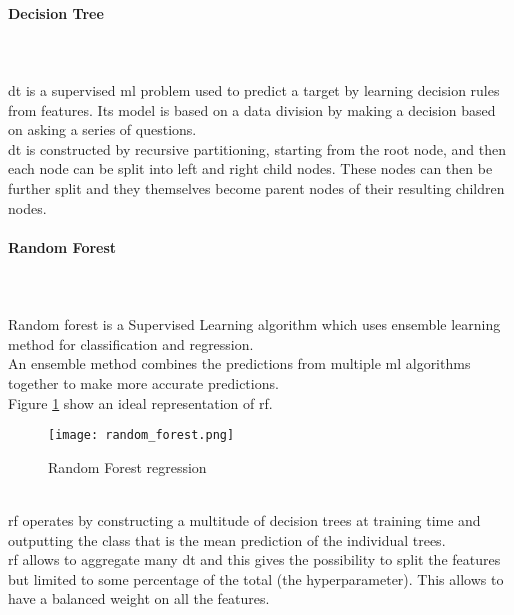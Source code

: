 \paragraph{Decision Tree}
\mbox{} \\ \\
\gls{dt} is a supervised \gls{ml} problem used to predict a target by learning decision rules from features. Its model is based on a data division by making a decision based on asking a series of questions.
\\ \indent
\gls{dt} is constructed by recursive partitioning, starting from the root node, and then each node can be split into left and right child nodes. These nodes can then be further split and they themselves become parent nodes of their resulting children nodes.

\paragraph{Random Forest}
\mbox{} \\ \\
Random forest is a Supervised Learning algorithm which uses ensemble learning method for classification and regression.
\\
An ensemble method combines the predictions from multiple \gls{ml} algorithms together to make more accurate predictions.
\\
Figure \ref{fig:random_forest} show an ideal representation of \gls{rf}.
\begin{figure}[h]
    \centering
    \texttt{[image: random\_forest.png]} 
	\caption{Random Forest regression}
    \label{fig:random_forest}
\end{figure} 
\\
\gls{rf} operates by constructing a multitude of decision trees at training time and outputting the class that is the mean prediction of the individual trees.
\\
\gls{rf} allows to aggregate many \gls{dt} and this gives the possibility to split the features but limited to some percentage of the total (the hyperparameter). This allows to have a balanced weight on all the features.

